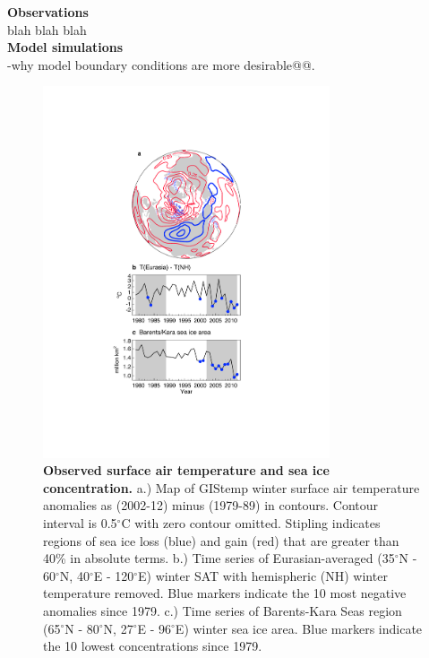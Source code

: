 \documentclass{nature}
\begin{document}
\begin{methods}
\textbf{Observations} \\
blah blah blah
\\
\textbf{Model simulations}\\
-why model boundary conditions are more desirable@@. 
\end{methods}

\begin{figure}%
\centering
\noindent\includegraphics[width=20pc]{Word/Figure_1.pdf}
\caption{\textbf{Observed surface air temperature and sea ice concentration.} a.) Map of GIStemp winter surface air temperature anomalies as (2002-12) minus (1979-89) in contours. Contour interval is 0.5$^\circ$C with zero contour omitted. Stipling indicates regions of sea ice loss (blue) and gain (red) that are greater than 40\% in absolute terms. b.) Time series of Eurasian-averaged (35$^\circ$N - 60$^\circ$N, 40$^\circ$E - 120$^\circ$E) winter SAT with hemispheric (NH) winter temperature removed. Blue markers indicate the 10 most negative anomalies since 1979. c.) Time series of Barents-Kara Seas region (65$^\circ$N - 80$^\circ$N, 27$^\circ$E - 96$^\circ$E) winter sea ice area. Blue markers indicate the 10 lowest concentrations since 1979.
}
\label{fig:fig1} 
\end{figure}
\end{document}
